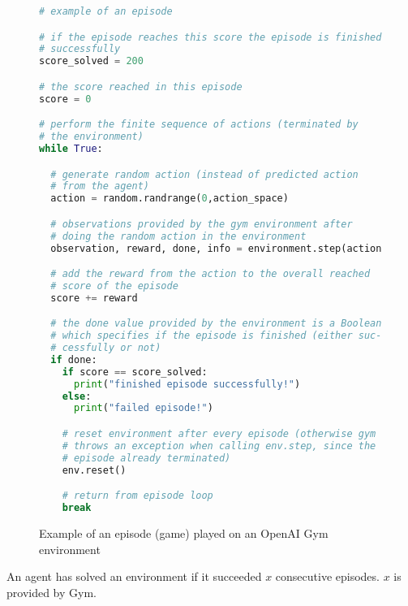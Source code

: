 \begin{figure}[H]
\begin{mdframed}[style=codebox]
\begin{lstlisting}[language=Python]
# example of an episode

# if the episode reaches this score the episode is finished
# successfully
score_solved = 200

# the score reached in this episode
score = 0

# perform the finite sequence of actions (terminated by
# the environment)
while True:

  # generate random action (instead of predicted action
  # from the agent)
  action = random.randrange(0,action_space)

  # observations provided by the gym environment after
  # doing the random action in the environment
  observation, reward, done, info = environment.step(action)

  # add the reward from the action to the overall reached
  # score of the episode
  score += reward

  # the done value provided by the environment is a Boolean
  # which specifies if the episode is finished (either suc-
  # cessfully or not)
  if done:
    if score == score_solved:
      print("finished episode successfully!")
    else:
      print("failed episode!")

    # reset environment after every episode (otherwise gym
    # throws an exception when calling env.step, since the
    # episode already terminated)
    env.reset()

    # return from episode loop
    break
\end{lstlisting}
\end{mdframed}
\caption{Example of an episode (game) played on an OpenAI
  Gym environment}
\end{figure}

An agent has solved an environment if it succeeded $x$
consecutive episodes. $x$ is provided by Gym.
